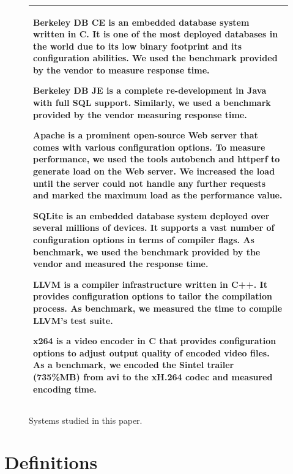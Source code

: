 \documentclass{sig-alternative}
\begin{document}


\begin{figure}[!t]\small
\begin{tabular}{|p{.95\linewidth}|}\hline
\textbf{Berkeley DB CE} is an embedded database system written in C. It is one of the most deployed databases in the world due to its low binary footprint and its configuration abilities. We used the benchmark provided by the vendor to measure response time.

\textbf{Berkeley DB JE} is a complete re-development in Java with full SQL support. Similarly, we used a benchmark provided by the vendor measuring response time.

\textbf{Apache} is a prominent open-source Web server that comes with various configuration options. To measure performance, we used the tools autobench and httperf to generate load on the Web server. We increased the load until the server could not handle any further requests and marked the maximum load as the performance value.

\textbf{SQLite} is an embedded database system deployed over several millions of devices. It supports a vast number of configuration options in terms of compiler flags. As benchmark, we used the benchmark provided by the vendor and measured the response time.

\textbf{LLVM} is a compiler infrastructure written in C++. It provides configuration options to tailor the compilation process. As benchmark, we measured the time to compile LLVM's test suite.

\textbf{x264} is a video encoder in C that provides configuration options to adjust output quality of encoded video files. As a benchmark, we encoded the Sintel trailer (735\%MB) from avi to the xH.264 codec and measured encoding time.\\\hline
\end{tabular}
\caption{Systems studied in this paper.}\label{fig:systems}
\end{figure}


\section{Definitions}
\end{document}
